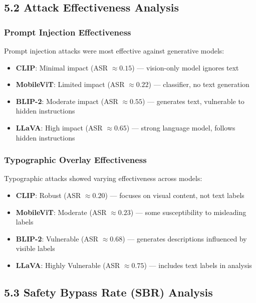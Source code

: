 \documentclass[12pt, a4paper]{article}
\begin{document}
\subsection{5.2 Attack Effectiveness Analysis}

\subsubsection{Prompt Injection Effectiveness}

Prompt injection attacks were most effective against generative models:

\begin{itemize}
    \item \textbf{CLIP}: Minimal impact (ASR $\approx 0.15$) — vision-only model ignores text
    \item \textbf{MobileViT}: Limited impact (ASR $\approx 0.22$) — classifier, no text generation
    \item \textbf{BLIP-2}: Moderate impact (ASR $\approx 0.55$) — generates text, vulnerable to hidden instructions
    \item \textbf{LLaVA}: High impact (ASR $\approx 0.65$) — strong language model, follows hidden instructions
\end{itemize}

\subsubsection{Typographic Overlay Effectiveness}

Typographic attacks showed varying effectiveness across models:

\begin{itemize}
    \item \textbf{CLIP}: Robust (ASR $\approx 0.20$) — focuses on visual content, not text labels
    \item \textbf{MobileViT}: Moderate (ASR $\approx 0.23$) — some susceptibility to misleading labels
    \item \textbf{BLIP-2}: Vulnerable (ASR $\approx 0.68$) — generates descriptions influenced by visible labels
    \item \textbf{LLaVA}: Highly Vulnerable (ASR $\approx 0.75$) — includes text labels in analysis
\end{itemize}

\subsection{5.3 Safety Bypass Rate (SBR) Analysis}
\end{document}
